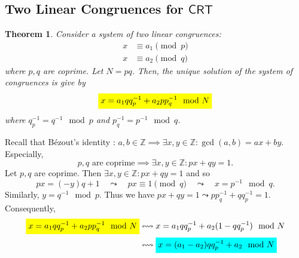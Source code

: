 \documentclass{article}
\newcommand{\mathcolorbox}[2]{\colorbox{#1}{$\displaystyle #2$}}
\newcommand{\inv}[1]{#1^{-1}}
\newtheorem*{theorem*}{Theorem}
\theoremstyle{definition}
\begin{document}
	\subsection{Two Linear Congruences for $\mathsf{CRT}$}
	

	\begin{tcolorbox}[title=Chinese Remainder Theorem (CRT) - Special Case]
		\begin{theorem*}
			Consider a system of two linear congruences:
			\begin{align*}
			x&\equiv a_1 \pmod{p}\\
			x&\equiv a_2 \pmod{q}
			\end{align*} where $p,q$ are coprime. Let $N=pq$. Then, the unique solution of the system of congruences is give by \begin{align*}
			\mathcolorbox{-blue}{x=a_1qq_p^{-1}+a_2pp_q^{-1}\mod{N}}
			\end{align*} where $q_p^{-1}=\inv{q}\mod{p}$ and $p_{q}^{-1}=\inv{p}\mod{q}$.
		\end{theorem*}
		\tcblower
		Recall that Bézout's identity : $
		a,b\in\mathbb{Z}\implies\exists x,y\in\mathbb{Z}:\gcd(a,b)=ax+by.
		$ Especially, \[
		\text{$p,q$ are coprime}\implies\exists x,y\in\mathbb{Z}: px+qy=1.
		\] Let $p,q$ are coprime. Then $\exists x,y\in\mathbb{Z}:px+qy=1$ and so \[
		px=(-y)q+1\quad\leadsto\quad px\equiv1\pmod{q}\quad\leadsto\quad x=p^{-1}\mod{q}.
		\] Similarly, $y=q^{-1}\mod{p}$. Thus we have $px+qy=1\leadsto pp_{q}^{-1}+qq_{p}^{-1}=1$. Consequently, \begin{align*}
		\mathcolorbox{-blue}{x=a_1qq_p^{-1}+a_2pp_q^{-1}\mod{N}} &\leftrightsquigarrow x=a_1qq_p^{-1}+a_2(1-qq_{p}^{-1})\mod{N}\\
		&\leftrightsquigarrow \mathcolorbox{-red}{x=(a_1-a_2)qq_p^{-1}+a_2\mod{N}}\\
		\end{align*}
	\end{tcolorbox}
	
\end{document}
